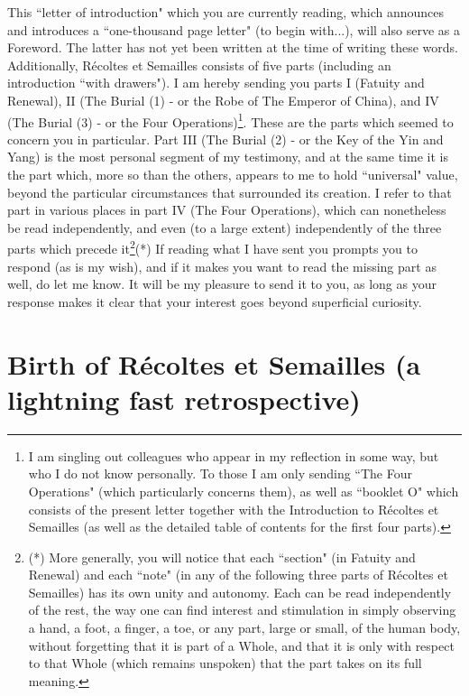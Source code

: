 This ``letter of introduction" which you are currently reading, which announces and introduces a ``one-thousand page letter" (to begin with...), will also serve as a Foreword. The latter has not yet been written at the time of writing these words. Additionally, R\'ecoltes et Semailles consists of five parts (including an introduction ``with drawers"). I am hereby sending you parts I (Fatuity and Renewal), II (The Burial (1) - or the Robe of The Emperor of China), and IV (The Burial (3) - or the Four Operations)\footnote{I am singling out colleagues who appear in my reflection in some way, but who I do not know personally. To those I am only sending ``The Four Operations" (which particularly concerns them), as well as ``booklet O" which consists of the present letter together with the Introduction to R\'ecoltes et Semailles (as well as the detailed table of contents for the first four parts).}. These are the parts which seemed to concern you in particular. Part III (The Burial (2) - or the Key of the Yin and Yang) is the most personal segment of my testimony, and at the same time it is the part which, more so than the others, appears to me to hold ``universal" value, beyond the particular circumstances that surrounded its creation. I refer to that part in various places in part IV (The Four Operations), which can nonetheless be read independently, and even (to a large extent) independently of the three parts which precede it\footnote{(*) More generally, you will notice that each ``section" (in Fatuity and Renewal) and each ``note" (in any of the following three parts of R\'ecoltes et Semailles) has its own unity and autonomy. Each can be read independently of the rest, the way one can find interest and stimulation in simply observing a hand, a foot, a finger, a toe, or any part, large or small, of the human body, without forgetting that it is part of a Whole, and that it is only with respect to that Whole (which remains unspoken) that the part takes on its full meaning.}(*) If reading what I have sent you prompts you to respond (as is my wish), and if it makes you want to read the missing part as well, do let me know. It will be my pleasure to send it to you, as long as your response makes it clear that your interest goes beyond superficial curiosity.

\section{Birth of R\'ecoltes et Semailles (a lightning fast retrospective)}

